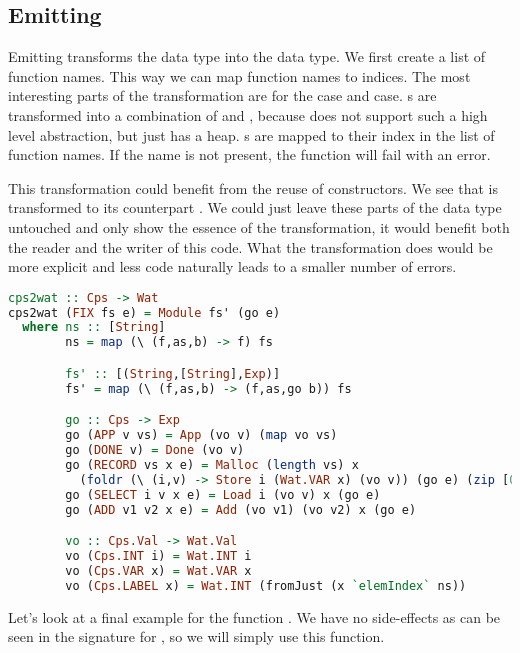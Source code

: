 {\subsection{\label{section:emit}Emitting}
Emitting transforms the  data type into the  data type. We first create a list of function names. This way we can map function names to indices. The most interesting parts of the transformation are for the  case and  case. s are transformed into a combination of  and , because  does not support such a high level abstraction, but just has a heap. s are mapped to their index in the list of function names. If the name is not present, the function will fail with an error.

This transformation could benefit from the reuse of constructors. We see that  is transformed to its  counterpart . We could just leave these parts of the data type untouched and only show the essence of the transformation, it would benefit both the reader and the writer of this code. What the transformation does would be more explicit and less code naturally leads to a smaller number of errors.

\begin{lstlisting}[language=Haskell]
cps2wat :: Cps -> Wat
cps2wat (FIX fs e) = Module fs' (go e)
  where ns :: [String]
        ns = map (\ (f,as,b) -> f) fs

        fs' :: [(String,[String],Exp)]
        fs' = map (\ (f,as,b) -> (f,as,go b)) fs

        go :: Cps -> Exp
        go (APP v vs) = App (vo v) (map vo vs)
        go (DONE v) = Done (vo v)
        go (RECORD vs x e) = Malloc (length vs) x
          (foldr (\ (i,v) -> Store i (Wat.VAR x) (vo v)) (go e) (zip [0..] vs))
        go (SELECT i v x e) = Load i (vo v) x (go e)
        go (ADD v1 v2 x e) = Add (vo v1) (vo v2) x (go e)

        vo :: Cps.Val -> Wat.Val
        vo (Cps.INT i) = Wat.INT i
        vo (Cps.VAR x) = Wat.VAR x
        vo (Cps.LABEL x) = Wat.INT (fromJust (x `elemIndex` ns))
\end{lstlisting}

Let's look at a final example for the function . We have no side-effects as can be seen in the signature for , so we will simply use this function.

}
